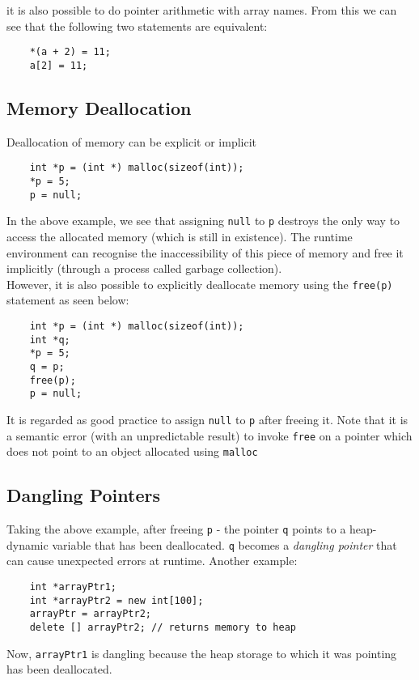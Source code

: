 it is also possible to do pointer arithmetic with array names. From this we can see that the following two statements are equivalent:
\begin{verbatim}
    *(a + 2) = 11;
    a[2] = 11;
\end{verbatim}

\subsection{Memory Deallocation}
Deallocation of memory can be explicit or implicit
\begin{verbatim}
    int *p = (int *) malloc(sizeof(int));
    *p = 5;
    p = null;
\end{verbatim}
In the above example, we see that assigning \verb|null| to \verb|p| destroys the only way to access the allocated memory (which is still in existence). The runtime environment can recognise the inaccessibility of this piece of memory and free it implicitly (through a process called garbage collection).\\

However, it is also possible to explicitly deallocate memory using the \verb|free(p)| statement as seen below:
\begin{verbatim}
    int *p = (int *) malloc(sizeof(int));
    int *q;
    *p = 5;
    q = p;
    free(p);
    p = null;
\end{verbatim}
It is regarded as good practice to assign \verb|null| to \verb|p| after freeing it. Note that it is a semantic error (with an unpredictable result) to invoke \verb|free| on a pointer which does not point to an object allocated using \verb|malloc|

\subsection{Dangling Pointers}
Taking the above example, after freeing \verb|p| - the pointer \verb|q| points to a heap-dynamic variable that has been deallocated. \verb|q| becomes a \textit{dangling pointer} that can cause unexpected errors at runtime. Another example:
\begin{verbatim}
    int *arrayPtr1;
    int *arrayPtr2 = new int[100];
    arrayPtr = arrayPtr2;
    delete [] arrayPtr2; // returns memory to heap
\end{verbatim}
Now, \verb|arrayPtr1| is dangling because the heap storage to which it was pointing has been deallocated.